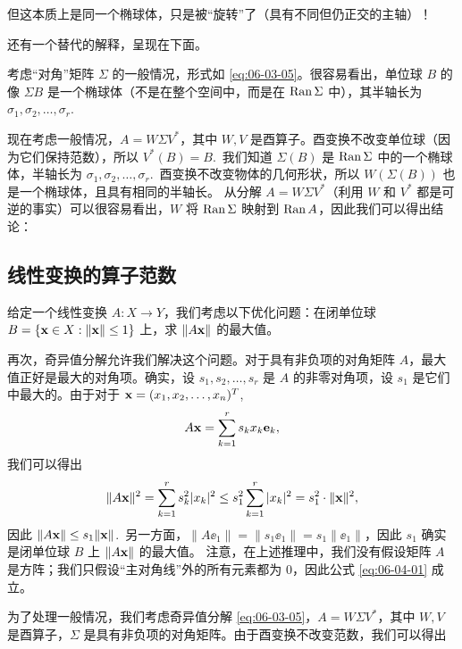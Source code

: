 但这本质上是同一个椭球体，只是被“旋转”了（具有不同但仍正交的主轴）！

还有一个替代的解释，呈现在下面。

考虑“对角”矩阵 $\Sigma$ 的一般情况，形式如 \eqref{eq:06-03-05}。很容易看出，单位球 $B$ 的像 $\Sigma B$ 是一个椭球体（不是在整个空间中，而是在 $\operatorname{Ran} \Sigma$ 中），其半轴长为 $\sigma_1, \sigma_2, \dots, \sigma_r$.~

现在考虑一般情况，$A = W \Sigma V^*$，其中 $W, V$ 是酉算子。酉变换不改变单位球（因为它们保持范数），所以 $V^*(B) = B$.~我们知道 $\Sigma(B)$ 是 $\operatorname{Ran} \Sigma$ 中的一个椭球体，半轴长为 $\sigma_1, \sigma_2, \dots, \sigma_r$.~酉变换不改变物体的几何形状，所以 $W(\Sigma(B))$ 也是一个椭球体，且具有相同的半轴长。
从分解 $A = W \Sigma V^*$（利用 $W$ 和 $V^*$ 都是可逆的事实）可以很容易看出，$W$ 将 $\operatorname{Ran} \Sigma$ 映射到 $\operatorname{Ran} A$，因此我们可以得出结论：



\subsection{线性变换的算子范数}\label{sec:06-04-02}

给定一个线性变换 $A : X \to Y$，我们考虑以下优化问题：在闭单位球 $B = \{ \mathbf{x} \in X : \|\mathbf{x}\| \le 1 \}$ 上，求 $\|A\mathbf{x}\|$ 的最大值。

再次，奇异值分解允许我们解决这个问题。对于具有非负项的对角矩阵 $A$，最大值正好是最大的对角项。确实，设 $s_1, s_2, \dots, s_r$ 是 $A$ 的非零对角项，设 $s_1$ 是它们中最大的。由于对于 $\mathbf{x} = (x_1, x_2, \dots, x_n)^T$,
\begin{equation}\label{eq:06-04-01}
A\mathbf{x} = \sum_{k=1}^r s_k x_k \mathbf{e}_k,
\end{equation}
我们可以得出
$$\|A\mathbf{x}\|^2 = \sum_{k=1}^r s_k^2 |x_k|^2 \le s_1^2 \sum_{k=1}^r |x_k|^2 = s_1^2 \cdot \|\mathbf{x}\|^2,$$
因此 $\|A\mathbf{x}\| \le s_1 \|\mathbf{x}\|$.~另一方面，$\|A\ee_1\| = \|s_1 \ee_1\| = s_1 \|\ee_1\|$，因此 $s_1$ 确实是闭单位球 $B$ 上 $\|A\mathbf{x}\|$ 的最大值。
注意，在上述推理中，我们没有假设矩阵 $A$ 是方阵；我们只假设“主对角线”外的所有元素都为 0，因此公式 \eqref{eq:06-04-01} 成立。

为了处理一般情况，我们考虑奇异值分解 \eqref{eq:06-03-05}，$A = W \Sigma V^*$，其中 $W, V$ 是酉算子，$\Sigma$ 是具有非负项的对角矩阵。由于酉变换不改变范数，我们可以得出

